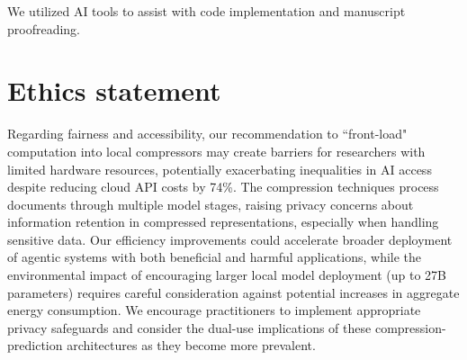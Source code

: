 \documentclass{article} %
\begin{document}



\newpage
We utilized AI tools to assist with code implementation and manuscript proofreading.

\section*{Ethics statement}
Regarding fairness and accessibility, our recommendation to ``front-load" computation into local compressors may create barriers for researchers with limited hardware resources, potentially exacerbating inequalities in AI access despite reducing cloud API costs by 74\%. The compression techniques process documents through multiple model stages, raising privacy concerns about information retention in compressed representations, especially when handling sensitive data. Our efficiency improvements could accelerate broader deployment of agentic systems with both beneficial and harmful applications, while the environmental impact of encouraging larger local model deployment (up to 27B parameters) requires careful consideration against potential increases in aggregate energy consumption. We encourage practitioners to implement appropriate privacy safeguards and consider the dual-use implications of these compression-prediction architectures as they become more prevalent.
\end{document}
